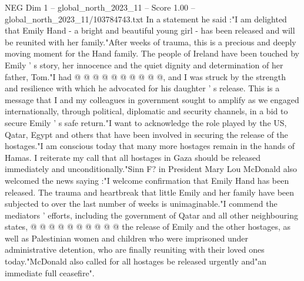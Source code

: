 \begin{textsample}{NEG Dim 1 – global\_north\_2023\_11 – Score 1.00 – global\_north\_2023\_11/103784743.txt}
In a statement he said :"I am delighted that Emily Hand - a bright and beautiful young girl - has been released and will be reunited with her family."After weeks of trauma, this is a precious and deeply moving moment for the Hand family.
The people of Ireland have been touched by Emily ' s story, her innocence and the quiet dignity and determination of her father, Tom."I had @ @ @ @ @ @ @ @ @ @, and I was struck by the strength and resilience with which he advocated for his daughter ' s release.
This is a message that I and my colleagues in government sought to amplify as we engaged internationally, through political, diplomatic and security channels, in a bid to secure Emily ' s safe return."I want to acknowledge the role played by the US, Qatar, Egypt and others that have been involved in securing the release of the hostages."I am conscious today that many more hostages remain in the hands of Hamas.
I reiterate my call that all hostages in Gaza should be released immediately and unconditionally."Sinn F? in President Mary Lou McDonald also welcomed the news saying :"I welcome confirmation that Emily Hand has been released.
The trauma and heartbreak that little Emily and her family have been subjected to over the last number of weeks is unimaginable."I commend the mediators ' efforts, including the government of Qatar and all other neighbouring states, @ @ @ @ @ @ @ @ @ @ the release of Emily and the other hostages, as well as Palestinian women and children who were imprisoned under administrative detention, who are finally reuniting with their loved ones today."McDonald also called for all hostages be released urgently and"an immediate full ceasefire".

\end{textsample}
